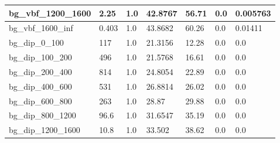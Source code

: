 \documentclass[a4paper, 10pt]{article}
\begin{document}
\begin{table}[H]
\begin{center}
\begin{tabular}{|m{23.0mm}|m{23.0mm}|m{18.0mm}|m{19.0mm}|m{19.0mm}|m{19.0mm}|m{19.0mm}|}
      \hline
      {\cellcolor{white}         bg\_vbf\_1200\_1600}& {\cellcolor{white}         2.25}& {\cellcolor{white}         1.0}& {\cellcolor{white}         42.8767}& {\cellcolor{white}         56.71}& {\cellcolor{green}         0.0}& {\cellcolor{green}         0.005763}\\
      \hline
      {\cellcolor{white}         bg\_vbf\_1600\_inf}& {\cellcolor{white}         0.403}& {\cellcolor{white}         1.0}& {\cellcolor{white}         43.8682}& {\cellcolor{white}         60.26}& {\cellcolor{green}         0.0}& {\cellcolor{green}         0.01411}\\
      \hline
      {\cellcolor{white}         bg\_dip\_0\_100}& {\cellcolor{white}         117}& {\cellcolor{white}         1.0}& {\cellcolor{white}         21.3156}& {\cellcolor{white}         12.28}& {\cellcolor{green}         0.0}& {\cellcolor{green}         0.0}\\
      \hline
      {\cellcolor{white}         bg\_dip\_100\_200}& {\cellcolor{white}         496}& {\cellcolor{white}         1.0}& {\cellcolor{white}         21.5768}& {\cellcolor{white}         16.61}& {\cellcolor{green}         0.0}& {\cellcolor{green}         0.0}\\
      \hline
      {\cellcolor{white}         bg\_dip\_200\_400}& {\cellcolor{white}         814}& {\cellcolor{white}         1.0}& {\cellcolor{white}         24.8054}& {\cellcolor{white}         22.89}& {\cellcolor{green}         0.0}& {\cellcolor{green}         0.0}\\
      \hline
      {\cellcolor{white}         bg\_dip\_400\_600}& {\cellcolor{white}         531}& {\cellcolor{white}         1.0}& {\cellcolor{white}         26.8814}& {\cellcolor{white}         26.02}& {\cellcolor{green}         0.0}& {\cellcolor{green}         0.0}\\
      \hline
      {\cellcolor{white}         bg\_dip\_600\_800}& {\cellcolor{white}         263}& {\cellcolor{white}         1.0}& {\cellcolor{white}         28.87}& {\cellcolor{white}         29.88}& {\cellcolor{green}         0.0}& {\cellcolor{green}         0.0}\\
      \hline
      {\cellcolor{white}         bg\_dip\_800\_1200}& {\cellcolor{white}         96.6}& {\cellcolor{white}         1.0}& {\cellcolor{white}         31.6547}& {\cellcolor{white}         35.19}& {\cellcolor{green}         0.0}& {\cellcolor{green}         0.0}\\
      \hline
      {\cellcolor{white}         bg\_dip\_1200\_1600}& {\cellcolor{white}         10.8}& {\cellcolor{white}         1.0}& {\cellcolor{white}         33.502}& {\cellcolor{white}         38.62}& {\cellcolor{green}         0.0}& {\cellcolor{green}         0.0}\\

\end{tabular}
\end{center}
\end{table}
\end{document}
